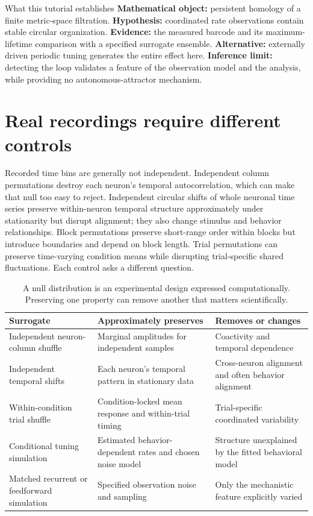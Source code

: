 \begin{insight}{What this tutorial establishes}
\textbf{Mathematical object:} persistent homology of a finite metric-space filtration. \textbf{Hypothesis:} coordinated rate observations contain stable circular organization. \textbf{Evidence:} the measured barcode and its maximum-lifetime comparison with a specified surrogate ensemble. \textbf{Alternative:} externally driven periodic tuning generates the entire effect here. \textbf{Inference limit:} detecting the loop validates a feature of the observation model and the analysis, while providing no autonomous-attractor mechanism.
\end{insight}

\section{Real recordings require different controls}
Recorded time bins are generally not independent. Independent column permutations destroy each neuron's temporal autocorrelation, which can make that null too easy to reject. Independent circular shifts of whole neuronal time series preserve within-neuron temporal structure approximately under stationarity but disrupt alignment; they also change stimulus and behavior relationships. Block permutations preserve short-range order within blocks but introduce boundaries and depend on block length. Trial permutations can preserve time-varying condition means while disrupting trial-specific shared fluctuations. Each control asks a different question.

\begin{table}[htbp]
\centering\small
\begin{tabularx}{\linewidth}{p{.23\linewidth}XX}
\toprule
Surrogate & Approximately preserves & Removes or changes \\
\midrule
Independent neuron-column shuffle & Marginal amplitudes for independent samples & Coactivity and temporal dependence \\
Independent temporal shifts & Each neuron's temporal pattern in stationary data & Cross-neuron alignment and often behavior alignment \\
Within-condition trial shuffle & Condition-locked mean response and within-trial timing & Trial-specific coordinated variability \\
Conditional tuning simulation & Estimated behavior-dependent rates and chosen noise model & Structure unexplained by the fitted behavioral model \\
Matched recurrent or feedforward simulation & Specified observation noise and sampling & Only the mechanistic feature explicitly varied \\
\bottomrule
\end{tabularx}
\caption{A null distribution is an experimental design expressed computationally. Preserving one property can remove another that matters scientifically.}
\end{table}

